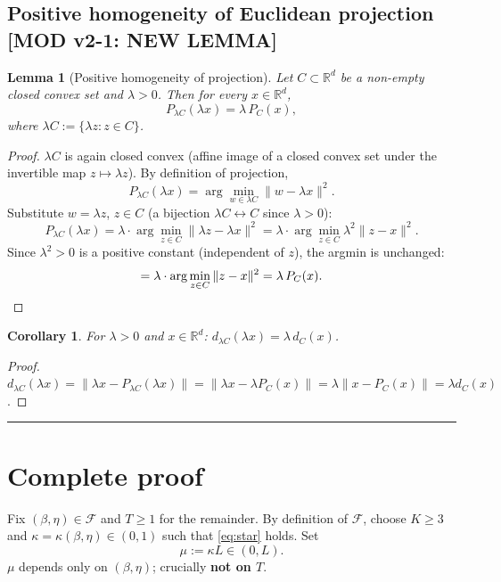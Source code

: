 \documentclass[11pt,a4paper]{article}
\theoremstyle{plain}
\newtheorem{lemma}[theorem]{Lemma}
\newtheorem{corollary}[theorem]{Corollary}
\theoremstyle{definition}
\theoremstyle{remark}
\newcommand{\R}{\mathbb{R}}
\newcommand{\F}{\mathcal{F}}
\begin{document}
\subsection{Positive homogeneity of Euclidean projection \textbf{[MOD v2-1: NEW LEMMA]}}

\begin{lemma}[Positive homogeneity of projection]
\label{lem:1.7}
Let $C \subset \R^d$ be a non-empty closed convex set and $\lambda > 0$. Then for every $x \in \R^d$,
\[
P_{\lambda C}(\lambda x) = \lambda\, P_C(x),
\]
where $\lambda C := \{\lambda z : z \in C\}$.
\end{lemma}

\begin{proof}
$\lambda C$ is again closed convex (affine image of a closed convex set under the invertible map $z \mapsto \lambda z$). By definition of projection,
\[
P_{\lambda C}(\lambda x) = \arg\min_{w \in \lambda C} \|w - \lambda x\|^2.
\]
Substitute $w = \lambda z$, $z \in C$ (a bijection $\lambda C \leftrightarrow C$ since $\lambda > 0$):
\[
P_{\lambda C}(\lambda x) = \lambda \cdot \arg\min_{z \in C} \|\lambda z - \lambda x\|^2 = \lambda \cdot \arg\min_{z \in C} \lambda^2 \|z - x\|^2.
\]
Since $\lambda^2 > 0$ is a positive constant (independent of $z$), the argmin is unchanged:
\[
= \lambda \cdot \arg\min_{z \in C} \|z - x\|^2 = \lambda\, P_C(x). \qedhere
\]
\end{proof}

\begin{corollary}
\label{cor:1.8}
For $\lambda > 0$ and $x \in \R^d$: $d_{\lambda C}(\lambda x) = \lambda\, d_C(x)$.
\end{corollary}

\begin{proof}
$d_{\lambda C}(\lambda x) = \|\lambda x - P_{\lambda C}(\lambda x)\| = \|\lambda x - \lambda P_C(x)\| = \lambda \|x - P_C(x)\| = \lambda d_C(x)$.
\end{proof}

\bigskip
\hrule
\bigskip
\section{Complete proof}

Fix $(\beta, \eta) \in \F$ and $T \geq 1$ for the remainder. By definition of $\F$, choose $K \geq 3$ and $\kappa = \kappa(\beta,\eta) \in (0,1)$ such that \eqref{eq:star} holds. Set
\begin{equation}
\mu := \kappa L \in (0, L).\tag{MU}\label{eq:MU}
\end{equation}
$\mu$ depends only on $(\beta, \eta)$; crucially \textbf{not on $T$}.
\end{document}
